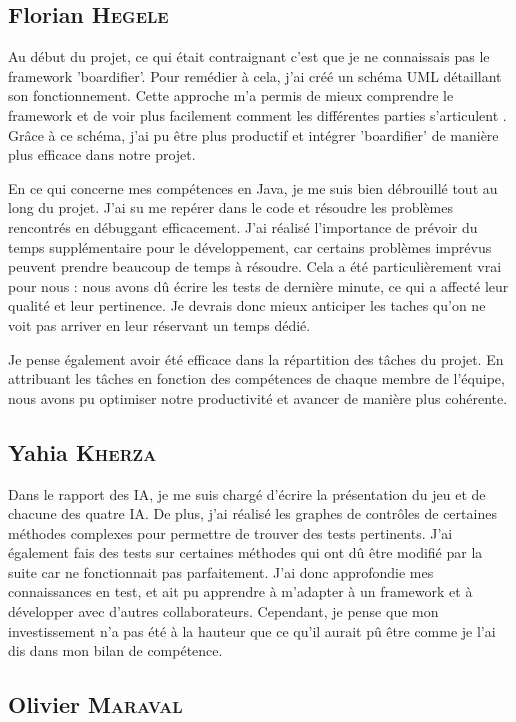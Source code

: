 \subsection*{Florian \textsc{Hegele}}

Au début du projet, ce qui était contraignant c'est que je ne connaissais pas le framework 'boardifier'. Pour remédier à cela, j'ai créé un schéma UML détaillant son fonctionnement. Cette approche m'a permis de mieux comprendre le framework et de voir plus facilement comment les différentes parties s'articulent . Grâce à ce schéma, j'ai pu être plus productif et intégrer 'boardifier' de manière plus efficace dans notre projet.

En ce qui concerne mes compétences en Java, je me suis bien débrouillé tout au long du projet. J'ai su me repérer dans le code et résoudre les problèmes rencontrés en débuggant efficacement. J'ai réalisé l'importance de prévoir du temps supplémentaire pour le développement, car certains problèmes imprévus peuvent prendre beaucoup de temps à résoudre. Cela a été particulièrement vrai pour nous : nous avons dû écrire les tests de dernière minute, ce qui a affecté leur qualité et leur pertinence. Je devrais donc mieux anticiper les taches qu'on ne voit pas arriver en leur réservant un temps dédié. 

Je pense également avoir été efficace dans la répartition des tâches du projet. En attribuant les tâches en fonction des compétences de chaque membre de l'équipe, nous avons pu optimiser notre productivité et avancer de manière plus cohérente.

\subsection*{Yahia \textsc{Kherza}}

Dans le rapport des IA, je me suis chargé d'écrire la présentation du jeu et de chacune des quatre IA. De plus, j'ai réalisé les graphes de contrôles de certaines méthodes complexes pour permettre de trouver des tests pertinents. 
J'ai également fais des tests sur certaines méthodes qui ont dû être modifié par la suite car ne fonctionnait pas parfaitement.
J'ai donc approfondie mes connaissances en test, et ait pu apprendre à m'adapter à un framework et à développer avec d'autres collaborateurs.
Cependant, je pense que mon investissement n'a pas été à la hauteur que ce qu'il aurait pû être comme je l'ai dis dans mon bilan de compétence.


\subsection*{Olivier \textsc{Maraval}}

